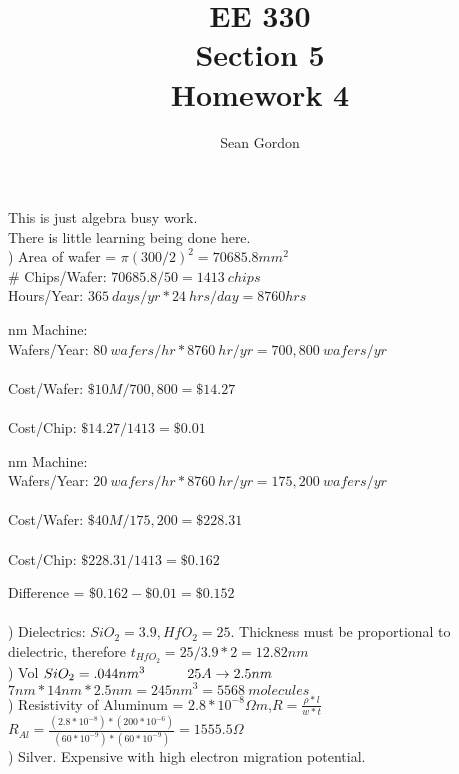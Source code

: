 \documentclass[12pt]{article}
\title{EE 330\\Section 5\\Homework 4}
\author{Sean Gordon}
\begin{document}
\maketitle
This is just algebra busy work.\\\indent There is little learning being done here.\\


) Area of wafer = $\pi (300/2)^2 = 70685.8mm^2$\\
\# Chips/Wafer: $70685.8/50 = 1413\ chips$\\
Hours/Year: $365\ days/yr * 24\ hrs/day = 8760 hrs$ 
\begin{multicols}{2}

 nm Machine:\\
Wafers/Year: $80\ wafers/hr * 8760\ hr/yr = 700,800\ wafers/yr$\\ \\
Cost/Wafer: $\$10M/700,800=\$14.27$\\ \\
Cost/Chip: $\$14.27 / 1413 = \$0.01$


 nm Machine:\\
Wafers/Year: $20\ wafers/hr * 8760\ hr/yr = 175,200\ wafers/yr$\\ \\
Cost/Wafer: $\$40M/175,200=\$228.31$\\ \\
Cost/Chip: $\$228.31 / 1413 = \$0.162$

\end{multicols} 
\noindent Difference = $\$0.162 - \$0.01 = \$0.152$\\\\


) Dielectrics: $SiO_2 = 3.9, HfO_2 = 25$.
Thickness must be proportional to dielectric, therefore $t_{HfO_2} = 25/3.9 * 2 = 12.82 nm$\\

) Vol $SiO_2 = .044nm^3\indent \indent 25 A \to 2.5 nm$\\
$7nm * 14nm * 2.5nm = 245 nm ^3 = 5568\ molecules$\\

) Resistivity of Aluminum = $2.8*10^{-8}\Omega m$,\indent $R = \frac{\rho*l}{w*t}$\\
$R_{Al} = \frac{(2.8*10^{-8})*(200*10^{-6})}{(60*10^{-9})*(60*10^{-9})} = 1555.5\Omega$\\


) Silver. Expensive with high electron migration potential.\\ 
\end{document}

